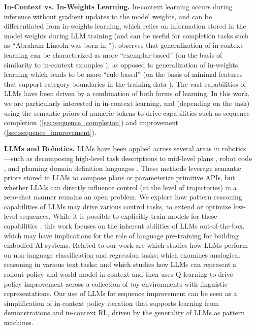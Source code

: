\textbf{In-Context vs. In-Weights Learning.} In-context learning occurs during inference without gradient updates to the model weights, and can be differentiated from in-weights learning, which relies on information stored in the model weights during LLM training \cite{chan2022transformers} (and can be useful for completion tasks such as ``Abraham Lincoln was born in \underline{\hspace{1em}}''). \citet{chan2022transformers} observes that generalization of in-context learning can be characterized as more ``exemplar-based'' (on the basis of similarity to in-context examples \cite{shepard1963stimulus}), as opposed to generalization of in-weights learning which tends to be more ``rule-based'' (on the basis of minimal features that support category boundaries in the training data \cite{ashby1986varieties}). The vast capabilities of LLMs \cite{ brown2020language,ouyang2022training,chen2021evaluating,chowdhery2022palm,anil2023palm} have been driven by a combination of both forms of learning. In this work, we are particularly interested in in-context learning, and (depending on the task) using the semantic priors of numeric tokens to drive capabilities such as sequence completion (\cref{sec:sequence_completion}) and improvement (\cref{sec:sequence_improvement}).

\textbf{LLMs and Robotics.} LLMs have been applied across several areas in robotics---such as decomposing high-level task descriptions to mid-level plans \cite{ahn2022can, huang2022language, huang2022inner,zeng2022socratic,song2022llm,huang2023grounded}, robot code \cite{liang2022code,wu2023tidybot,singh2023progprompt,wang2023voyager}, and planning domain definition languages \cite{liu2023llm+}. These methods leverage semantic priors stored in LLMs to compose plans or parameterize primitive APIs, but whether LLMs can directly influence control (\eg at the level of trajectories) in a zero-shot manner remains an open problem. We explore how pattern reasoning capabilities of LLMs may drive various control tasks, to extend or optimize low-level sequences. While it is possible to explicitly train models for these capabilities \citep{laskin2022context, xu2022prompting, zhang2023motiongpt, lee2023supervised}, this work focuses on the inherent abilities of LLMs out-of-the-box, which may have implications for the role of language pre-training for building embodied AI systems. %
Related to our work are \cite{dinh2022lift} which studies how LLMs perform on non-language classification and regression tasks; \cite{webb2023emergent} which examines analogical reasoning in various text tasks; and \cite{brooks2022context} which studies how LLMs can represent a rollout policy and world model in-context and then uses Q-learning to drive policy improvement across a collection of toy environments with linguistic representations. Our use of LLMs for sequence improvement can be seen as a simplification of in-context policy iteration that supports learning from demonstrations and in-context RL, driven by the generality of LLMs as pattern machines. 